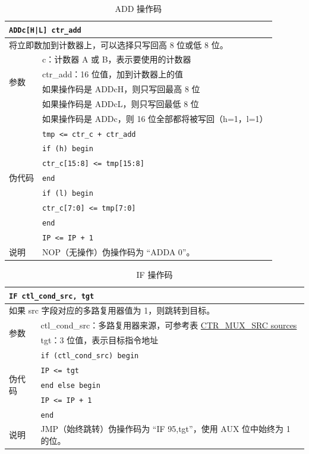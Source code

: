 \documentclass[main\_\_CN.tex]{subfiles}
\begin{document}
\begin{table}[H]
\caption{ADD 操作码}
\label{tab:bitscrm-add-opcode}
\begin{tabular}{|l|l|}
\hline
\multicolumn{2}{|l|}{\texttt{ADDc[H|L] ctr\_add}} \\
\hline
\multicolumn{2}{|L{17cm}|}{将立即数加到计数器上，可以选择只写回高 8 位或低 8 位。} \\
\hline
\multirow{4}{*}{参数} & c：计数器 A 或 B，表示要使用的计数器 \\
& ctr\_add：16 位值，加到计数器上的值 \\
& 如果操作码是 ADDcH，则只写回最高 8 位 \\
& 如果操作码是 ADDcL，则只写回最低 8 位 \\
& 如果操作码是 ADDc，则 16 位全部都将被写回（h=1，l=1）\\
\hline
\multirow{7}{*}{伪代码} & \texttt{tmp <= ctr\_c + ctr\_add} \\
& \texttt{if (h) begin} \\
& \hspace*{4mm} \texttt{ctr\_c[15:8] <= tmp[15:8]} \\
& \texttt{end} \\
& \texttt{if (l) begin} \\
& \hspace*{4mm} \texttt{ctr\_c[7:0] <= tmp[7:0]} \\
& \texttt{end} \\
& \texttt{IP <= IP + 1} \\
\hline
说明 & NOP（无操作）伪操作码为 ``ADDA 0”。\\
\hline
\end{tabular}
\end{table}

\begin{table}[H]
\caption{IF 操作码}
\label{tab:bitscrm-if-opcode}
\begin{tabular}{|l|p{14cm}|}
\hline
\multicolumn{2}{|l|}{\texttt{IF ctl\_cond\_src, tgt}} \\
\hline
\multicolumn{2}{|L{17cm}|}{如果 src 字段对应的多路复用器值为 1，则跳转到目标。} \\
\hline
\multirow{2}{*}{参数} & ctl\_cond\_src：多路复用器来源，可参考表 \hyperref[tab:bitscrm-ctrmuxsrc]{CTR\_MUX\_SRC sources} \\
& tgt：3 位值，表示目标指令地址  \\
\hline
\multirow{5}{*}{伪代码} & \texttt{if (ctl\_cond\_src) begin} \\
& \hspace*{4mm} \texttt{IP <= tgt} \\
& \texttt{end else begin} \\
& \hspace*{4mm} \texttt{IP <= IP + 1} \\
& \texttt{end} \\
\hline
说明 &  JMP（始终跳转）伪操作码为 ``IF 95,tgt”，使用 AUX 位中始终为 1 的位。\\
\hline
\end{tabular}
\end{table}
\end{document}
